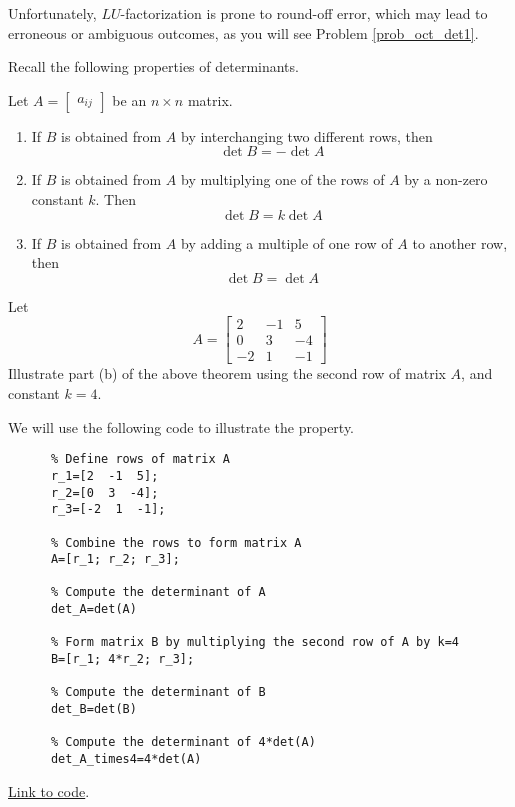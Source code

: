 \documentclass{ximera}
\begin{document}
Unfortunately, $LU$-factorization is prone to round-off error, which may lead to erroneous or ambiguous outcomes, as you will see Problem \ref{prob_oct_det1}.

Recall the following properties of determinants.

\begin{theorem}[\ref{th:elemrowopsanddet}]
  Let $A=\begin{bmatrix}a_{ij}\end{bmatrix}$ be an $n\times n$ matrix. 
  \begin{enumerate}
  \item\label{item:rowswapanddet}
  If $B$ is obtained from $A$ by interchanging two different rows, then $$\det{B}=-\det{A}$$
  \item \label{item:rowconstantmultanddet}
  If $B$ is obtained from $A$ by multiplying one of the rows of $A$ by a non-zero constant $k$.  Then $$\det{B}=k\det{A}$$
  \item \label{item:addmultotherrowdet}
  If $B$ is obtained from $A$ by adding a multiple of one row of $A$ to another row, then
  $$\det{B}=\det{A}$$
  \end{enumerate}
  \end{theorem}

\begin{example}\label{ex_det_prop}
  Let $$A=\begin{bmatrix}
  2 & -1 & 5\\0 & 3 & -4\\-2 & 1 & -1
  \end{bmatrix}$$
  Illustrate part (b) of the above theorem using the second row of matrix $A$, and constant $k=4$.
  \begin{explanation}
    We will use the following code to illustrate the property.
    \begin{verbatim}
      % Define rows of matrix A
      r_1=[2  -1  5];
      r_2=[0  3  -4];
      r_3=[-2  1  -1];

      % Combine the rows to form matrix A
      A=[r_1; r_2; r_3];

      % Compute the determinant of A
      det_A=det(A)

      % Form matrix B by multiplying the second row of A by k=4
      B=[r_1; 4*r_2; r_3];

      % Compute the determinant of B
      det_B=det(B)

      % Compute the determinant of 4*det(A)
      det_A_times4=4*det(A)
    \end{verbatim}

    \href{https://sagecell.sagemath.org/?z=eJyVjrEKgzAURXfBf3iLUAWhajpJBtPSn5AiWmMbahKJkda_bxIV3EqXNxzuO5wALrRjgoKS7xFkB7zWin2g8D1VJbhMAeIE4HTLLUhxeQTIDEMLyHAZm0liV5b4XgBnyRtr1M_VqiV0UvGdusClsedgjPZku9dh0strSzVVnIlaaNtlvgypCmzuoQiX_XWnJdDMwKdes6GfmXg4yUjvUrQ2wzns5IWR75E1AEV_JJAlgbgEEv7co2hrdeWVZpyOCG_4C2FMb7M=&lang=octave&interacts=eJyLjgUAARUAuQ==}{Link to code}.
  \end{explanation}

\end{example}
\end{document}
